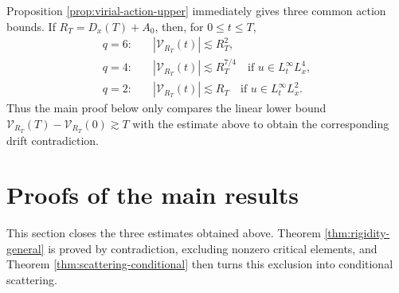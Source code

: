 \documentclass[smallextended,envcountsect,nospthms]{svjour3}
\numberwithin{equation}{section}
\theoremstyle{spbreak}
\theoremstyle{spdefbreak}
\theoremstyle{spdefbreak}
\begin{document}
Proposition \ref{prop:virial-action-upper} immediately gives three common action bounds. If $R_T=D_x(T)+A_0$, then, for $0\le t\le T$,
\[
\begin{aligned}
  q=6:\quad& |\mathcal V_{R_T}(t)|\lesssim R_T^2,\\
  q=4:\quad& |\mathcal V_{R_T}(t)|\lesssim R_T^{7/4}
        \quad\text{if }u\in L_t^\infty L_x^4,\\
  q=2:\quad& |\mathcal V_{R_T}(t)|\lesssim R_T
        \quad\text{if }u\in L_t^\infty L_x^2.
\end{aligned}
\]
Thus the main proof below only compares the linear lower bound $\mathcal V_{R_T}(T)-\mathcal V_{R_T}(0)\gtrsim T$ with the estimate above to obtain the corresponding drift contradiction.

\section{Proofs of the main results}\label{sec:main-proofs}

This section closes the three estimates obtained above. Theorem \ref{thm:rigidity-general} is proved by contradiction, excluding nonzero critical elements, and Theorem \ref{thm:scattering-conditional} then turns this exclusion into conditional scattering.
\end{document}
